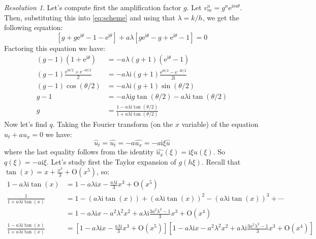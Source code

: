 \documentclass[10pt,a4paper]{article}
\newcommand{\ii}{\mathrm{i}} %
\renewcommand{\O}{\mathrm{O}} %
\theoremstyle{definition}
\theoremstyle{remark}
\newtheorem*{res}{Resolution}
\renewcommand{\exp}[1]{\mathrm{e}^{#1}} %
\begin{document}
\begin{res}
  Let's compute first the amplification factor $g$. Let $v_m^n=g^n\exp{\ii m\theta}$. Then, substituting this into \eqref{eq:scheme} and using that $\lambda = k/h$, we get the following equation:
  $$
    \left[g+g\exp{\ii \theta}-1-\exp{\ii\theta}\right]+ a\lambda \left[g\exp{\ii\theta}-g+\exp{\ii\theta}-1\right]=0
  $$
  Factoring this equation we have:
  \begin{align*}
    (g-1)(1+\exp{\ii\theta})                            & = -a\lambda (g+1)(\exp{\ii\theta} - 1)                                \\
    (g-1)\frac{\exp{\ii\theta/2}+\exp{-\ii\theta/2}}{2} & = -a\lambda\ii (g+1)\frac{\exp{\ii\theta/2}-\exp{-\ii\theta/2}}{2\ii} \\
    (g-1)\cos(\theta/2)                                 & = -a\lambda\ii (g+1)\sin(\theta/2)                                    \\
    g - 1                                               & = -a\lambda\ii g\tan(\theta/2) - a\lambda\ii \tan(\theta/2)           \\
    g                                                   & = \frac{1-a\lambda\ii\tan(\theta/2)}{1+a\lambda\ii\tan(\theta/2)}
  \end{align*}
  Now let's find $q$. Taking the Fourier transform (on the $x$ variable) of the equation $u_t+au_x=0$ we have:
  $$
    \widehat{u}_t =\widehat{u_t}= - a\widehat{u_x}= -a\ii\xi\widehat{u}
  $$
  where the last equality follows from the identity $\widehat{u_x}(\xi)=\ii\xi\widehat{u}(\xi)$. So $q(\xi)=-a\ii\xi$.
  Let's study first the Taylor expansion of $g(h\xi)$. Recall that $\tan(x)=x+ \frac{x^3}{3}+\O(x^5)$, so:
  \begin{align*}
    1 - a\lambda\ii\tan(x)                              & = 1 - a\lambda \ii x - \frac{a\lambda\ii}{3}x^3 + \O(x^5)                                                                                                                 \\
    \frac{1}{1+ a\lambda\ii\tan(x)}                     & = 1 - (a\lambda\ii\tan(x)) + {(a\lambda\ii\tan(x))}^2 -{(a\lambda\ii\tan(x))}^3 + \cdots                                                                                  \\
                                                        & = 1 - a\lambda\ii x -a^2\lambda^2x^2 + a\lambda\ii\frac{3a^2\lambda^2 - 1}{3}x^3+ \O(x^4)                                                                                 \\
    \frac{1- a\lambda\ii\tan(x)}{1+ a\lambda\ii\tan(x)} & = \left[1 - a\lambda\ii x - \frac{a\lambda\ii}{3}x^3 + \O(x^5)\right]\left[1 - a\lambda\ii x -a^2\lambda^2x^2 + a\lambda\ii\frac{3a^2\lambda^2 - 1}{3}x^3+ \O(x^4)\right] \\

\end{align*}
\end{res}
\end{document}
